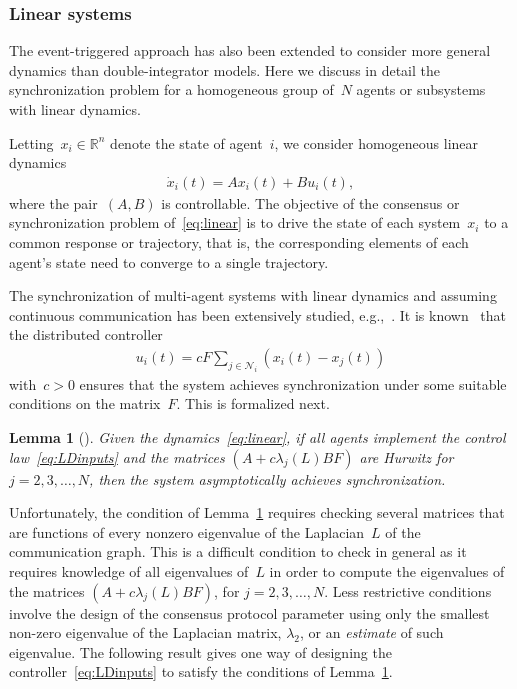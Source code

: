 \documentclass{autart}
\newtheorem{lemma}[theorem]{Lemma}
\newcommand{\real}{{\mathbb{R}}}
\newcommand{\marginJC}[1]{\marginpar{\color{green}\tiny\ttfamily#1}}
\newcommand{\margin}[1]{\marginpar{\color{red}\tiny\ttfamily#1}}
\begin{document}
\subsubsection{Linear systems}   \label{sec:Linear}

The event-triggered approach has also been extended to consider more
general dynamics than double-integrator models.  Here we discuss in
detail the synchronization problem for a homogeneous group of~$N$
agents or subsystems with linear dynamics.

Letting~$x_i \in \real^n$ denote the state of agent~$i$, we consider
homogeneous linear dynamics
\begin{align}\label{eq:linear}
  \dot{x}_i(t) = Ax_i(t) + Bu_i(t) ,
\end{align}
where the pair~$(A,B)$ is controllable.  The objective of the
consensus or synchronization problem of~\eqref{eq:linear} is to drive
the state of each system~$x_i$ to a common response or trajectory,
that is, the corresponding elements of each agent's state need to
converge to a single trajectory.

The synchronization of multi-agent systems with linear dynamics and
assuming continuous communication has been extensively studied,
e.g.,~\cite{ZL-ZD-GC-LH:10,ZL-ZD-GC:11,CQM-JFZ:10,WR:08,LS-RS:09,YS-JH:12,SET:08,SET:09,JHS-HS-JB:09}.
It is known~\citep{CQM-JFZ:10,EG-YC-DWC:14} that the distributed
controller
\begin{align}\label{eq:LDinputs}
  u_i(t)= c F \sum_{j\in\mathcal{N}_i}(x_i(t)-x_j(t)) 
\end{align}
with~$c>0$ ensures that the system achieves synchronization under some
suitable conditions on the matrix~$F$.
This is formalized next.

\begin{lemma}[\citep{EG-YC-DWC:14}]\label{th:NS_LD}
  Given the dynamics~\eqref{eq:linear}, if all agents implement the
  control law~\eqref{eq:LDinputs} and the matrices
  $(A + c \lambda_j(L) B F)$ are Hurwitz for $j = 2,3, \dots, N$, then
  the system asymptotically achieves synchronization.
\end{lemma}

Unfortunately, the condition of Lemma~\ref{th:NS_LD} requires checking
several matrices that are functions of every nonzero eigenvalue of the
Laplacian~$L$ of the communication graph. This is a  difficult
condition to check in general as it requires knowledge of all
eigenvalues of~$L$ in order to compute the eigenvalues of the matrices
$(A + c \lambda_j(L) B F)$, for $j = 2,3, \dots, N$. Less restrictive
conditions involve the design of the consensus protocol parameter
using only the smallest non-zero eigenvalue of the Laplacian matrix,
$\lambda_2$, or an \emph{estimate} of such eigenvalue. The following
result gives one way of designing the controller~\eqref{eq:LDinputs}
to satisfy the conditions of Lemma~\ref{th:NS_LD}.
\end{document}

